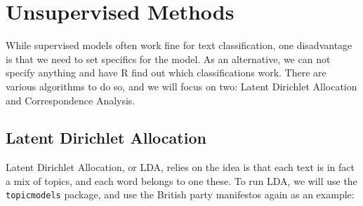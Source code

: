 \documentclass[
]{book}
\begin{document}
\hypertarget{unsupervised-methods}{%
\chapter{Unsupervised Methods}\label{unsupervised-methods}}

While supervised models often work fine for text classification, one disadvantage is that we need to set specifics for the model. As an alternative, we can not specify anything and have R find out which classifications work. There are various algorithms to do so, and we will focus on two: Latent Dirichlet Allocation and Correspondence Analysis.

\hypertarget{latent-dirichlet-allocation}{%
\section{Latent Dirichlet Allocation}\label{latent-dirichlet-allocation}}

Latent Dirichlet Allocation, or LDA, relies on the idea is that each text is in fact a mix of topics, and each word belongs to one these. To run LDA, we will use the \texttt{topicmodels} package, and use the British party manifestos again as an example:
\end{document}
